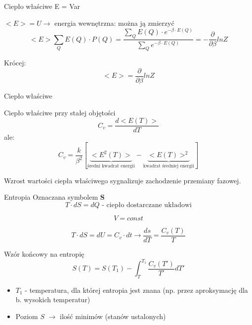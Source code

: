 	\begin{frame}{Ciepło właściwe}
		E = Var
		\begin{block}{$ <E> = U \rightarrow$ energia wewnętrzna: można ją zmierzyć}
			$$
			< E >\sum_Q E(Q) \cdot P(Q) = \dfrac{\sum_Q E(Q) \cdot e^{-\beta\cdot E(Q)}}{\sum_Q e^{-\beta\cdot E(Q)}} = - \frac{\partial}{\partial \beta} ln Z
			$$
		\end{block}
	
		\begin{block}{Krócej:}
			$$
			<E> = \frac{\partial}{\partial \beta} ln Z
			$$
		\end{block}	
	\end{frame}
	
	\begin{frame}{Ciepło właściwe}
		\begin{block}{Ciepło właściwe przy stałej objętości}
			$$
			C_v = \frac{d<E(T)>}{dT}
			$$
			ale:
			$$
			C_v = \frac{k}{\beta^2}[\underbrace{<E^2(T)>}_{\text{średni kwadrat energii}} - \underbrace{<E(T)>^2}_{\text{kwadrat średniej energii}}]
			$$
		\end{block}		
	
	Wzrost wartości ciepła właściwego sygnalizuje zachodzenie przemiany fazowej.	
	\end{frame}

	\begin{frame}{Entropia}
		Oznaczana symbolem \textbf{S}
		$$
		T \cdot dS = dQ \text{ - ciepło dostarczane układowi}
		$$
		
		$$
		V = const
		$$
		
		$$
		T \cdot dS = dU = C_v \cdot dt \rightarrow \frac{ds}{dT} = \frac{C_v(T)}{T}
		$$
		
		\begin{block}{Wzór końcowy na entropię}
			$$
			S(T) = S(T_1) - \int_T^{T_1} \frac{C_v(T')}{T'}dT'
			$$
		\end{block}
		
		\begin{itemize}
			\item $T_1$ - temperatura, dla której entropia jest znana (np. przez aproksymację dla b. wysokich temperatur)
			\item Poziom $S$ $\rightarrow$ ilość minimów (stanów ustalonych)		
		\end{itemize}
	\end{frame}